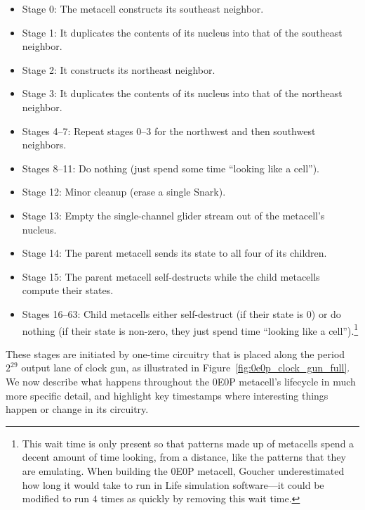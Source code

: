 \begin{itemize}
	\item Stage 0: The metacell constructs its southeast neighbor.\smallskip
	
	\item Stage 1: It duplicates the contents of its nucleus into that of the southeast neighbor.\smallskip
	
	\item Stage 2: It constructs its northeast neighbor.\smallskip
	
	\item Stage 3: It duplicates the contents of its nucleus into that of the northeast neighbor.\smallskip
	
	\item Stages 4--7: Repeat stages 0--3 for the northwest and then southwest neighbors.\smallskip
	
	\item Stages 8--11: Do nothing (just spend some time ``looking like a cell'').\smallskip
	
	\item Stage 12: Minor cleanup (erase a single Snark).\smallskip
	
	\item Stage 13: Empty the single-channel glider stream out of the metacell's nucleus.\smallskip
	
	\item Stage 14: The parent metacell sends its state to all four of its children.\smallskip
	
	\item Stage 15: The parent metacell self-destructs while the child metacells compute their states.\smallskip
	
	\item Stages 16--63: Child metacells either self-destruct (if their state is $0$) or do nothing (if their state is non-zero, they just spend time ``looking like a cell'').\footnote{This wait time is only present so that patterns made up of metacells spend a decent amount of time looking, from a distance, like the patterns that they are emulating. When building the 0E0P metacell, Goucher underestimated how long it would take to run in Life simulation software---it could be modified to run $4$ times as quickly by removing this wait time.}\smallskip
\end{itemize}

These stages are initiated by one-time circuitry that is placed along the period $2^{29}$ output lane of clock gun, as illustrated in Figure~\ref{fig:0e0p_clock_gun_full}. We now describe what happens throughout the 0E0P metacell's lifecycle in much more specific detail, and highlight key timestamps where interesting things happen or change in its circuitry.

